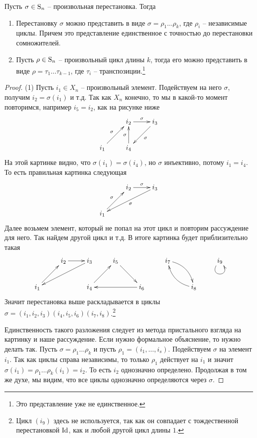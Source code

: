 \begin{claim}\label{claim:PermutationStructure}
Пусть $\sigma\in\operatorname{S}_{n}$ -- произвольная перестановка. Тогда
\begin{enumerate}
\item Перестановку $\sigma$ можно представить в виде $\sigma = \rho_1 \ldots \rho_k$, где $\rho_i$ -- независимые циклы. Причем это представление единственное с точностью до перестановки сомножителей.

\item Пусть $\rho\in\operatorname{S}_{n}$ -- произвольный цикл длины $k$, тогда его можно представить в виде $\rho = \tau_1\ldots \tau_{k-1}$, где $\tau_i$ -- транспозиции.\footnote{Это представление уже не единственное.}
\end{enumerate}
\end{claim}
\begin{proof}
(1) Пусть $i_1\in X_n$ -- произвольный элемент. Подействуем на него $\sigma$, получим $i_2 = \sigma(i_1)$ и т.д. Так как $X_n$ конечно, то мы в какой-то момент повторимся, например $i_5 = i_2$, как на рисунке ниже
\[
\xymatrix{
	{}&{i_2}\ar[r]^{\sigma}&{i_3}\ar[dl]^{\sigma}\\
	{i_1}\ar[ru]^{\sigma}&{i_4}\ar[u]^{\sigma}&{}\\
}
\]
На этой картинке видно, что $\sigma(i_1) = \sigma(i_4)$, но $\sigma$ инъективно, потому $i_1 = i_4$. То есть правильная картинка следующая
\[
\xymatrix{
	{}&{i_2}\ar[r]^{\sigma}&{i_3}\ar[dll]^{\sigma}\\
	{i_1}\ar[ru]^{\sigma}&{}&{}\\
}
\]
Далее возьмем элемент, который не попал на этот цикл и повторим рассуждение для него. Так найдем другой цикл и т.д. В итоге картинка будет приблизительно такая
\[
\xymatrix{
	{}&{i_2}\ar[r]&{i_3}\ar[dll]&{i_5}\ar[rd]&{}&{i_7}\ar@/^10pt/[dr]&{}&{i_9}\ar@(dl,dr)\\
	{i_1}\ar[ru]&{}&{i_4}\ar[ru]&{}&{i_6}\ar[ll]&{}&{i_8}\ar@/^10pt/[ul]&{}\\
}
\]
Значит перестановка выше раскладывается в циклы $\sigma = (i_1,i_2,i_3) (i_4,i_5,i_6)(i_7,i_8)$.\footnote{Цикл $(i_9)$ здесь не используется, так как он совпадает с тождественной перестановкой $\operatorname{Id}$, как и любой другой цикл длины $1$.} 

Единственность такого разложения следует из метода пристального взгляда на картинку и наше рассуждение. Если нужно формальное объяснение, то нужно делать так. Пусть $\sigma = \rho_1\ldots \rho_k$ и пусть $\rho_1 = (i_1,\ldots,i_s)$. Подействуем $\sigma$ на элемент $i_1$. Так как циклы справа независимы, то только $\rho_1$ действует на $i_1$ и значит $\sigma(i_1)=\rho_1 \ldots \rho_k(i_1) = i_2$. То есть $i_2$ однозначно определено. Продолжая в том же духе, мы видим, что все циклы однозначно определяются через $\sigma$.



\end{proof}
